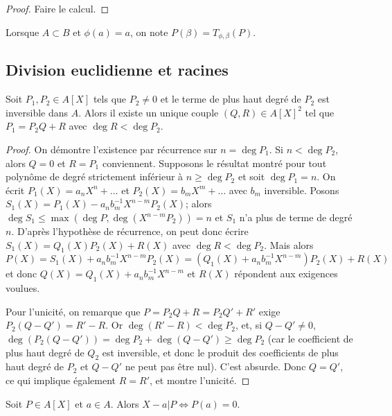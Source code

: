 \begin{proof}
Faire le calcul.
\end{proof}

\begin{rem}
Lorsque $A \subset B$ et $\phi(a) = a$, on note $P(\beta) = T_{\phi,\beta}(P)$.
\end{rem}

\subsection{Division euclidienne et racines}

\begin{thm}
Soit $P_1,P_2 \in A[X]$ tels que $P_2 \neq 0$ et le terme de plus haut degré de $P_2$ est inversible dans $A$. Alors il existe un unique couple $(Q,R) \in A[X]^2$ tel que $P_1 = P_2 Q + R$ avec $\deg R < \deg P_2$.
\end{thm}

\begin{proof}
On démontre l'existence par récurrence sur $n = \deg P_1$. Si $n < \deg P_2$, alors $Q = 0$ et $R = P_1$ conviennent. Supposons le résultat montré pour tout polynôme de degré strictement inférieur à $n \geq \deg P_2$ et soit $\deg P_1 = n$. On écrit $P_1(X) = a_n X^n + \ldots$ et $P_2(X) = b_m X^m + \ldots$ avec $b_m$ inversible. Posons $S_1(X) = P_1(X) - a_n b_m^{-1} X^{n-m} P_2(X)$; alors $\deg S_1 \leq \max(\deg P, \deg(X^{n-m} P_2)) = n$ et $S_1$ n'a plus de terme de degré $n$. D'après l'hypothèse de récurrence, on peut donc écrire $S_1(X) = Q_1(X) P_2(X) + R(X)$ avec $\deg R < \deg P_2$. Mais alors $P(X) = S_1(X) + a_n b_m^{-1} X^{n-m} P_2(X) = (Q_1(X) + a_n b_m^{-1} X^{n-m}) P_2(X) + R(X)$ et donc $Q(X) = Q_1(X) + a_n b_m^{-1} X^{n-m}$ et $R(X)$ répondent aux exigences voulues.

Pour l'unicité, on remarque que $P = P_2 Q + R = P_2 Q' + R'$ exige $P_2(Q - Q') = R' - R$. Or $\deg(R' - R) < \deg P_2$, et, si $Q - Q' \neq 0$, $\deg(P_2(Q - Q')) = \deg P_2 + \deg(Q - Q') \geq \deg P_2$ (car le coefficient de plus haut degré de $Q_2$ est inversible, et donc le produit des coefficients de plus haut degré de $P_2$ et $Q - Q'$ ne peut pas être nul). C'est absurde. Donc $Q = Q'$, ce qui implique également $R = R'$, et montre l'unicité.
\end{proof}

\begin{thm}
Soit $P \in A[X]$ et $a \in A$. Alors $X - a | P \Leftrightarrow P(a) = 0$.
\end{thm}

